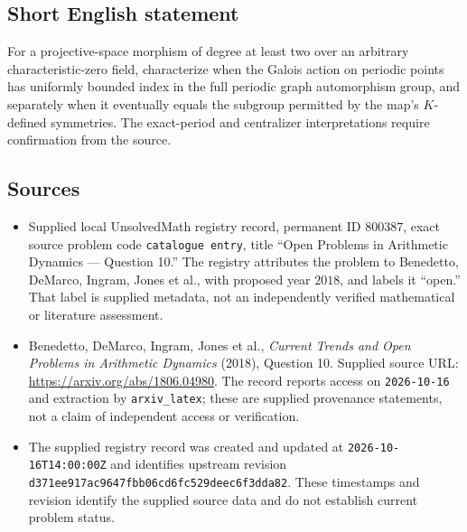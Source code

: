 \documentclass[11pt]{article}
\begin{document}
\subsection{Short English statement}
For a projective-space morphism of degree at least two over an arbitrary characteristic-zero field, characterize when the Galois action on periodic points has uniformly bounded index in the full periodic graph automorphism group, and separately when it eventually equals the subgroup permitted by the map's \(K\)-defined symmetries. The exact-period and centralizer interpretations require confirmation from the source.
\subsection{Sources}
\begin{itemize}
\item Supplied local UnsolvedMath registry record, permanent ID \(800387\), exact source problem code \texttt{catalogue entry}, title ``Open Problems in Arithmetic Dynamics --- Question 10.'' The registry attributes the problem to Benedetto, DeMarco, Ingram, Jones et al., with proposed year \(2018\), and labels it ``open.'' That label is supplied metadata, not an independently verified mathematical or literature assessment.
\item Benedetto, DeMarco, Ingram, Jones et al., \emph{Current Trends and Open Problems in Arithmetic Dynamics} (2018), Question 10. Supplied source URL: \url{https://arxiv.org/abs/1806.04980}. The record reports access on \texttt{2026-10-16} and extraction by \texttt{arxiv\_latex}; these are supplied provenance statements, not a claim of independent access or verification.
\item The supplied registry record was created and updated at \texttt{2026-10-16T14:00:00Z} and identifies upstream revision \texttt{d371ee917ac9647fbb06cd6fc529deec6f3dda82}. These timestamps and revision identify the supplied source data and do not establish current problem status.
\end{itemize}
\end{document}
